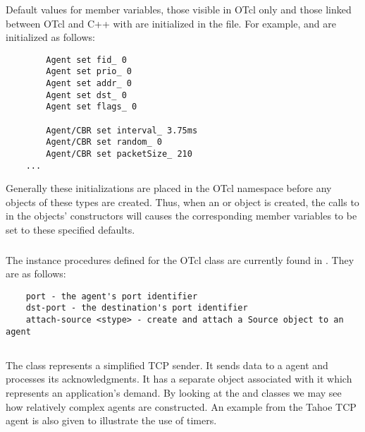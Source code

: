 \subsubsection{}

Default values for member variables, those visible in OTcl only and those
linked between OTcl and C++ with  are initialized
in the  file.  For example,
 and 
are initialized as follows:
\begin{small}
\begin{verbatim}
        Agent set fid_ 0
        Agent set prio_ 0
        Agent set addr_ 0
        Agent set dst_ 0
        Agent set flags_ 0

        Agent/CBR set interval_ 3.75ms
        Agent/CBR set random_ 0
        Agent/CBR set packetSize_ 210
	...
\end{verbatim}
\end{small}

Generally these initializations are placed in the OTcl namespace
before any objects of these types are created.
Thus, when an  or  object
is created, the calls to 
in the objects' constructors will causes the corresponding member variables
to be set to these specified defaults.

\subsubsection{}

The instance procedures defined for the OTcl  class are
currently found in .
They are as follows:
\begin{small}
\begin{verbatim}
	port - the agent's port identifier
	dst-port - the destination's port identifier
	attach-source <stype> - create and attach a Source object to an agent
\end{verbatim}
\end{small}

\subsection{}

The class  represents a simplified TCP sender.
It sends data to a  agent and processes its acknowledgments.
It has a separate object associated with it which represents
an application's demand.
By looking at the  and  classes
we may see how relatively complex agents are constructed.
An example from the Tahoe TCP agent  is also given
to illustrate the use of timers.

